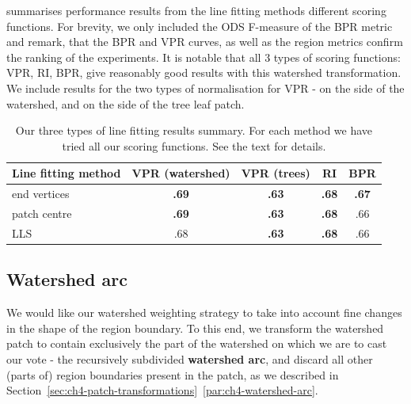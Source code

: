  summarises performance results from the line fitting methods \wrt different scoring functions. For brevity, we only included %
the ODS F-measure of the BPR metric and remark, that the BPR and VPR curves, as well as the region metrics confirm the ranking of the experiments. 
It is notable that all 3 types of scoring functions: VPR, RI, BPR, give reasonably good results %
with this watershed transformation. We include results for the two types of normalisation for VPR - on the side of the watershed, and on the side of the tree leaf patch.

\begin{table}[htbp]
\renewcommand{\arraystretch}{1.3}
\centering
\scriptsize
\begin{tabular}{|l|c|c|c|c|}
\hline 
Line fitting method & VPR (watershed) & VPR (trees) & RI & BPR \\
\hline 
end vertices & {\bf .69} & {\bf .63} & {\bf .68} & {\bf .67} \\
patch centre & {\bf .69} & {\bf .63} & {\bf .68} & .66 \\
LLS & .68 & {\bf .63} & {\bf .68} & .66 \\
\hline
\end{tabular}
\caption[Our three types of line fitting results summary]{Our three types of line fitting results summary. For each method we have tried all our scoring functions. See the text for details.}
\label{tab:line-fitting-experiments}
\end{table}


\subsection{Watershed arc}
We would like our watershed weighting strategy to take into account fine changes in the shape of the region boundary. To this end, we transform the watershed patch to contain exclusively the part of the watershed on which we are to cast our vote - the recursively subdivided {\bf watershed arc}, and discard all other (parts of) region boundaries present in the patch, as we described in Section~\ref*{sec:ch4-patch-transformations}~\ref{par:ch4-watershed-arc}.


